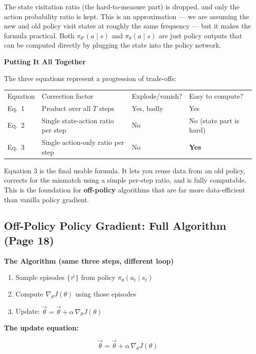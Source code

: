 The state visitation ratio (the hard-to-measure part) is dropped, and only the action probability
ratio is kept. This is an approximation --- we are assuming the new and old policy visit states at
roughly the same frequency --- but it makes the formula practical. Both
$\pi_{\theta'}(a \mid s)$ and $\pi_\theta(a \mid s)$ are just policy outputs that can be computed
directly by plugging the state into the policy network.

\textbf{Putting It All Together}

The three equations represent a progression of trade-offs:

\begin{center}
\begin{tabular}{llll}
Equation & Correction factor & Explode/vanish? & Easy to compute? \\[4pt]
Eq.\ 1 & Product over all $T$ steps & Yes, badly & Yes \\
Eq.\ 2 & Single state-action ratio per step & No & No (state part is hard) \\
Eq.\ 3 & Single action-only ratio per step & No & \textbf{Yes} \\
\end{tabular}
\end{center}

Equation 3 is the final usable formula. It lets you reuse data from an old policy, corrects for
the mismatch using a simple per-step ratio, and is fully computable. This is the foundation for
\textbf{off-policy} algorithms that are far more data-efficient than vanilla policy gradient.

\subsection{Off-Policy Policy Gradient: Full Algorithm (Page 18)}

\textbf{The Algorithm (same three steps, different loop)}

\begin{enumerate}
  \item Sample episodes $\{\tau^i\}$ from policy $\pi_\theta(a_t \mid s_t)$
  \item Compute $\nabla_\theta J(\theta)$ using those episodes
  \item Update: $\vec{\theta} = \vec{\theta} + \alpha\,\nabla_\theta J(\theta)$
\end{enumerate}

\textbf{The update equation:}

\[
\vec{\theta} = \vec{\theta} + \alpha\,\nabla_\theta J(\theta)
\]

